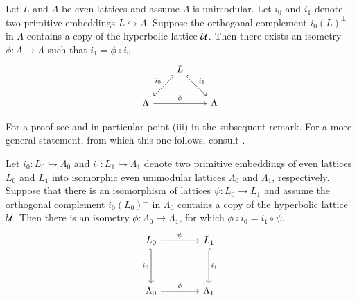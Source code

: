 \begin{proposition}
    \label{extending an isometry 1}
    \emph{\cite{Nikulin1980}}
    Let $L$ and $\Lambda$ be even lattices and assume $\Lambda$ is unimodular. Let $i_0$ and $i_1$ denote two primitive embeddings $L \hookrightarrow \Lambda$. Suppose the orthogonal complement $i_0(L)^\perp$ in $\Lambda$ contains a copy of the hyperbolic lattice $\mathcal U$. Then there exists an isometry $\phi \colon \Lambda \to \Lambda$ such that $i_1 = \phi \circ i_0$.
    \[\begin{tikzcd}[row sep = 1em, column sep = 2em]
        & L \\
        \\
        \Lambda && \Lambda
        \arrow["{i_0}"', hook', from=1-2, to=3-1]
        \arrow["{i_1}", hook, from=1-2, to=3-3]
        \arrow["\phi", from=3-1, to=3-3]
    \end{tikzcd}\]
\end{proposition}

\begin{remark}
    For a proof see \cite[\S 14, Theorem 1.12]{Huybrechts2016} and in particular point (iii) in the subsequent remark. For a more general statement, from which this one follows, consult \cite[Theorem 1.14.4]{Nikulin1980}.
\end{remark}

\begin{corollary}
    \label{extending an isometry 2}
    Let $i_0 \colon L_0 \hookrightarrow \Lambda_0$ and $i_1 \colon L_1 \hookrightarrow \Lambda_1$ denote two primitive embeddings of even lattices $L_0$ and $L_1$ into isomorphic even unimodular lattices $\Lambda_0$ and $\Lambda_1$, respectively. Suppose that there is an isomorphism of lattices $\psi \colon L_0 \to L_1$ and assume the orthogonal complement $i_0(L_0)^\perp$ in $\Lambda_0$ contains a copy of the hyperbolic lattice $\mathcal U$. Then there is an isometry $\phi \colon \Lambda_0 \to \Lambda_1$, for which $\phi \circ i_0 = i_1 \circ \psi$.
    \[\begin{tikzcd}[column sep = 2em]
        {L_0} && {L_1} \\
        \\
        \Lambda_0 && \Lambda_1
        \arrow["\psi", from=1-1, to=1-3]
        \arrow["{i_0}"', hook', from=1-1, to=3-1]
        \arrow["{i_1}", hook, from=1-3, to=3-3]
        \arrow["\phi", from=3-1, to=3-3]
    \end{tikzcd}\]
\end{corollary}

